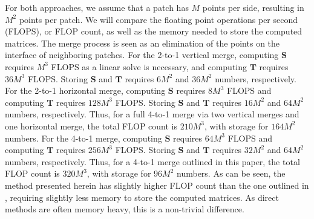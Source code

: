 For both approaches, we assume that a patch has $M$ points per side, resulting in $M^2$ points per patch. We will compare the floating point operations per second (FLOPS), or FLOP count, as well as the memory needed to store the computed matrices. The merge process is seen as an elimination of the points on the interface of neighboring patches. For the 2-to-1 vertical merge, computing $\textbf{S}$ requires $M^3$ FLOPS as a linear solve is necessary, and computing $\textbf{T}$ requires $36M^3$ FLOPS. Storing $\textbf{S}$ and $\textbf{T}$ requires $6M^2$ and $36M^2$ numbers, respectively. For the 2-to-1 horizontal merge, computing $\textbf{S}$ requires $8M^3$ FLOPS and computing $\textbf{T}$ requires $128M^3$ FLOPS. Storing $\textbf{S}$ and $\textbf{T}$ requires $16M^2$ and $64M^2$ numbers, respectively. Thus, for a full 4-to-1 merge via two vertical merges and one horizontal merge, the total FLOP count is $210M^3$, with storage for $164M^2$ numbers. For the 4-to-1 merge, computing $\textbf{S}$ requires $64M^3$ FLOPS and computing $\textbf{T}$ requires $256M^3$ FLOPS. Storing $\textbf{S}$ and $\textbf{T}$ requires $32M^2$ and $64M^2$ numbers, respectively. Thus, for a 4-to-1 merge outlined in this paper, the total FLOP count is $320M^3$, with storage for $96M^2$ numbers. As can be seen, the method presented herein has slightly higher FLOP count than the one outlined in \cite{gillman2014direct}, requiring slightly less memory to store the computed matrices. As direct methods are often memory heavy, this is a non-trivial difference.